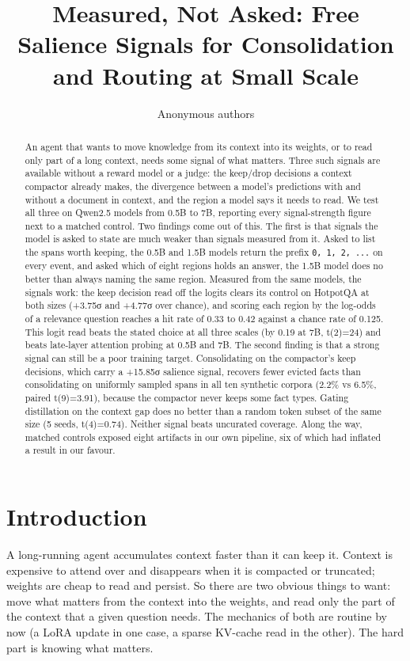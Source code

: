 \documentclass[10pt]{article}
\title{Measured, Not Asked: Free Salience Signals for Consolidation and Routing at Small Scale}
\author{Anonymous authors}
\begin{document}
\maketitle

\begin{abstract}
An agent that wants to move knowledge from its context into its weights, or to read only
part of a long context, needs some signal of what matters. Three such signals are available
without a reward model or a judge: the keep/drop decisions a context compactor already makes,
the divergence between a model's predictions with and without a document in context, and the
region a model says it needs to read. We test all three on Qwen2.5 models from 0.5B to 7B,
reporting every signal-strength figure next to a matched control. Two findings come out of
this. The first is that signals the model is asked to state are much weaker than signals
measured from it. Asked to list the spans worth keeping, the 0.5B and 1.5B models return the
prefix \texttt{0,\ 1,\ 2,\ ...} on every event, and asked which of eight regions holds an answer, the
1.5B model does no better than always naming the same region. Measured from the same models,
the signals work: the keep decision read off the logits clears its control on HotpotQA at
both sizes (+3.75σ and +4.77σ over chance), and scoring each region by the log-odds of a relevance question reaches a hit rate of 0.33 to
0.42 against a chance rate of 0.125. This logit read beats the stated choice at all three
scales (by 0.19 at 7B, t(2)=24) and beats late-layer attention probing at 0.5B and 7B. The
second finding is that a strong signal can still be a poor training target. Consolidating on
the compactor's keep decisions, which carry a +15.85σ salience signal, recovers fewer evicted
facts than consolidating on uniformly sampled spans in all ten synthetic corpora (2.2\% vs
6.5\%, paired t(9)=3.91), because the compactor never keeps some fact types. Gating
distillation on the context gap does no better than a random token subset of the same size
(5 seeds, t(4)=0.74). Neither signal beats uncurated coverage. Along the way, matched
controls exposed eight artifacts in our own pipeline, six of which had inflated a result in
our favour.
\end{abstract}

\section{Introduction}

A long-running agent accumulates context faster than it can keep it. Context is expensive to
attend over and disappears when it is compacted or truncated; weights are cheap to read and
persist. So there are two obvious things to want: move what matters from the context into
the weights, and read only the part of the context that a given question needs. The
mechanics of both are routine by now (a LoRA update in one case, a sparse KV-cache read in
the other). The hard part is knowing what matters.
\end{document}
